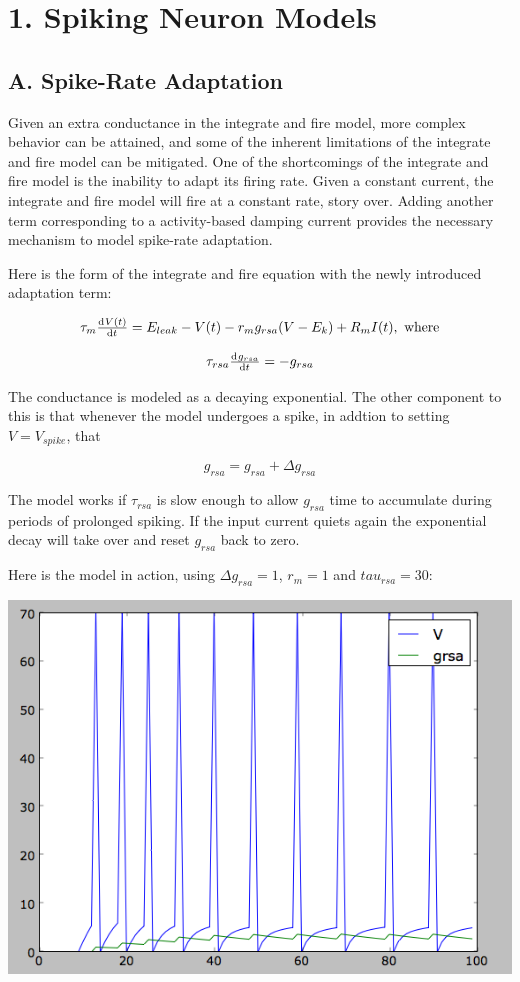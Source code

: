 \documentclass[12pt]{article}
\begin{document}
\maketitle

\section{1. Spiking Neuron Models}

\subsection{A. Spike-Rate Adaptation}

Given an extra conductance in the integrate and fire model, more complex behavior can be attained, and some of the inherent limitations of the integrate and fire model can be mitigated.  One of the shortcomings of the integrate and fire model is the inability to adapt its firing rate.  Given a constant current, the integrate and fire model will fire at a constant rate, story over.  Adding another term corresponding to a activity-based damping current provides the necessary mechanism to model spike-rate adaptation.

Here is the form of the integrate and fire equation with the newly introduced adaptation term:

$$ \tau_m\od{V(t)}{t}=E_{leak}-V(t)-r_mg_{rsa}(V-E_k)+R_mI(t),\text{ where}$$

$$ \tau_{rsa}\od{g_{rsa}}{t}=-g_{rsa} $$

The conductance is modeled as a decaying exponential.  The other component to this is that whenever the model undergoes a spike, in addtion to setting $V=V_{spike}$, that 

$$ g_{rsa}=g_{rsa}+\Delta g_{rsa}$$

The model works if $\tau_{rsa}$ is slow enough to allow $g_{rsa}$ time to accumulate during periods of prolonged spiking.  If the input current quiets again the exponential decay will take over and reset $g_{rsa}$ back to zero.  

Here is the model in action, using $\Delta g_{rsa}=1$, $r_m=1$ and $tau_{rsa}=30$:

\vspace{15pt}
\includegraphics[scale=0.63]{adaptation.png}
\vspace{5pt}
\end{document}
